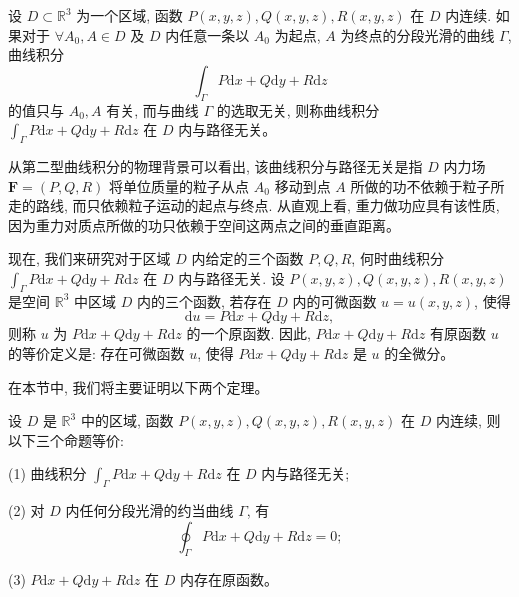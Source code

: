 \documentclass[12pt,fontset=fandol]{ctexart}
\begin{document}
\begin{definition}\label{course-definition-16-7-1}\quad 设 $D\subset\mathbb R^3$ 为一个区域, 函数 $P(x,y,z),Q(x,y,z),R(x,y,z)$ 在 $D$ 内连续. 如果对于 $\forall A_0,A\in D$ 及 $D$ 内任意一条以 $A_0$ 为起点, $A$ 为终点的分段光滑的曲线 $\Gamma$, 曲线积分
\[
  \int_\Gamma P\mathrm dx+Q\mathrm dy+R\mathrm dz
\]
的值只与 $A_0,A$ 有关, 而与曲线 $\Gamma$ 的选取无关, 则称曲线积分 $\int_\Gamma P\mathrm dx+Q\mathrm dy+R\mathrm dz$ 在 $D$ 内与路径无关。

从第二型曲线积分的物理背景可以看出, 该曲线积分与路径无关是指 $D$ 内力场 $\boldsymbol F=(P,Q,R)$ 将单位质量的粒子从点 $A_0$ 移动到点 $A$ 所做的功不依赖于粒子所走的路线, 而只依赖粒子运动的起点与终点. 从直观上看, 重力做功应具有该性质, 因为重力对质点所做的功只依赖于空间这两点之间的垂直距离。

现在, 我们来研究对于区域 $D$ 内给定的三个函数 $P,Q,R$, 何时曲线积分 $\int_\Gamma P\mathrm dx+Q\mathrm dy+R\mathrm dz$ 在 $D$ 内与路径无关. 设 $P(x,y,z),Q(x,y,z),R(x,y,z)$ 是空间 $\mathbb R^3$ 中区域 $D$ 内的三个函数, 若存在 $D$ 内的可微函数 $u=u(x,y,z)$, 使得
\[
  \mathrm du=P\mathrm dx+Q\mathrm dy+R\mathrm dz,
\]
则称 $u$ 为 $P\mathrm dx+Q\mathrm dy+R\mathrm dz$ 的一个原函数. 因此, $P\mathrm dx+Q\mathrm dy+R\mathrm dz$ 有原函数 $u$ 的等价定义是: 存在可微函数 $u$, 使得 $P\mathrm dx+Q\mathrm dy+R\mathrm dz$ 是 $u$ 的全微分。

在本节中, 我们将主要证明以下两个定理。

\end{definition}
\begin{theorem}\label{course-theorem-16-7-1}\quad 设 $D$ 是 $\mathbb R^3$ 中的区域, 函数 $P(x,y,z),Q(x,y,z),R(x,y,z)$ 在 $D$ 内连续, 则以下三个命题等价:

(1) 曲线积分 $\int_\Gamma P\mathrm dx+Q\mathrm dy+R\mathrm dz$ 在 $D$ 内与路径无关;

(2) 对 $D$ 内任何分段光滑的约当曲线 $\Gamma$, 有
\[
  \oint_\Gamma P\mathrm dx+Q\mathrm dy+R\mathrm dz=0;
\]

(3) $P\mathrm dx+Q\mathrm dy+R\mathrm dz$ 在 $D$ 内存在原函数。

\end{theorem}
\end{document}
